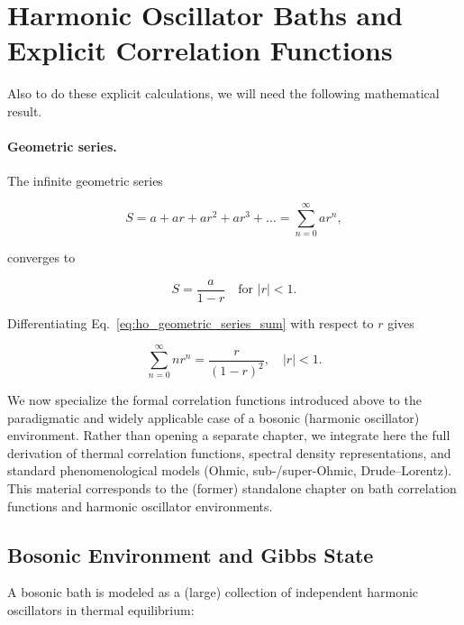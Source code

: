\section{Harmonic Oscillator Baths and Explicit Correlation Functions}
\label{sec:harmonic_oscillator_baths}

\noindent
Also to do these explicit calculations, we will need the following mathematical result.


\paragraph{Geometric series.}
The infinite geometric series

\begin{equation} \label{eq:ho_infinite_geometric_series}
	S = a + ar + ar^2 + ar^3 + \dots = \sum_{n=0}^{\infty} ar^n,
\end{equation}

\noindent
converges to

\begin{equation} \label{eq:ho_geometric_series_sum}
	S = \frac{a}{1-r} \quad \text{for } |r|<1.
\end{equation}

\noindent
Differentiating Eq.~\eqref{eq:ho_geometric_series_sum} with respect to $r$ gives

\begin{equation} \label{eq:ho_derivation_geometric_sum}
	\sum_{n=0}^{\infty} n r^n = \frac{r}{(1-r)^2}, \quad |r|<1.
\end{equation}



\noindent
We now specialize the formal correlation functions introduced above to the paradigmatic and widely applicable case of a bosonic (harmonic oscillator) environment. Rather than opening a separate chapter, we integrate here the full derivation of thermal correlation functions, spectral density representations, and standard phenomenological models (Ohmic, sub-/super-Ohmic, Drude--Lorentz). This material corresponds to the (former) standalone chapter on bath correlation functions and harmonic oscillator environments.


\subsection{Bosonic Environment and Gibbs State}
\label{subsec:bosonic_environment_gibbs}

\noindent
A bosonic bath is modeled as a (large) collection of independent harmonic oscillators in thermal equilibrium:

